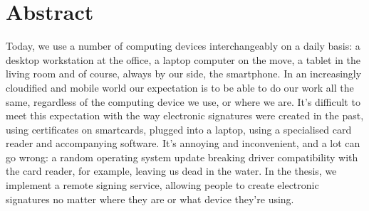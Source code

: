 \chapter{Abstract}
\label{ch:abstract}


Today, we use a number of computing devices interchangeably on a daily basis: a desktop workstation at the office,
a laptop computer on the move, a tablet in the living room and of course, always by our side, the smartphone.
In an increasingly cloudified and mobile world our expectation is to be able to do our work all the same,
regardless of the computing device we use, or where we are.
It's difficult to meet this expectation with the way electronic signatures were created in the past,
using certificates on smartcards, plugged into a laptop, using a specialised card reader and accompanying software.
It's annoying and inconvenient, and a lot can go wrong:
a random operating system update breaking driver compatibility with the card reader, for example,
leaving us dead in the water.
In the thesis, we implement a remote signing service, allowing people to create electronic signatures no matter
where they are or what device they're using.

